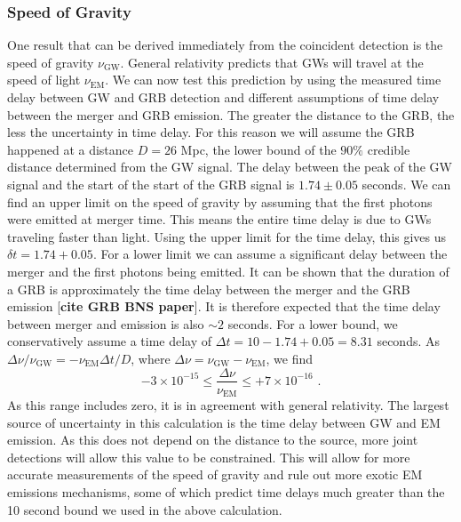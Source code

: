 \documentclass[11pt]{cuthesis}
\newcommand{\fs}{\text{ .}}
\begin{document}
\subsubsection{Speed of Gravity}
One result that can be derived immediately from the coincident detection is the speed of gravity $\nu_\text{GW}$. General relativity predicts that GWs will travel at the speed of light $\nu_\text{EM}$. We can now test this prediction by using the measured time delay between GW and GRB detection and different assumptions of time delay between the merger and GRB emission. The greater the distance to the GRB, the less the uncertainty in time delay. For this reason we will assume the GRB happened at a distance $D = 26$ Mpc, the lower bound of the $90\%$ credible distance determined from the GW signal.  The delay between the peak of the GW signal and the start of the start of the GRB signal is $1.74 \pm 0.05$ seconds. We can find an upper limit on the speed of gravity by assuming that the first photons were emitted at merger time. This means the entire time delay is due to GWs traveling faster than light. Using the upper limit for the time delay, this gives us $\delta t = 1.74 + 0.05$. For a lower limit we can assume a significant delay between the merger and the first photons being emitted. It can be shown that the duration of a GRB is approximately the time delay between the merger and the GRB emission [\textbf{cite GRB BNS paper}]. It is therefore expected that the time delay between merger and emission is also $\sim2$ seconds. For a lower bound, we conservatively assume a time delay of $\Delta t = 10 - 1.74 + 0.05= 8.31$ seconds. As $\Delta \nu /\nu_\text{GW} = -\nu_\text{EM}\Delta t/D$, where $\Delta \nu = \nu_\text{GW} - \nu_\text{EM}$, we find
\begin{equation}
-3 \times 10^{-15} \leq \frac{\Delta \nu}{\nu_\text{EM}} \leq +7\times 10^{-16} \fs
\end{equation}
As this range includes zero, it is in agreement with general relativity. The largest source of uncertainty in this calculation is the time delay between GW and EM emission. As this does not depend on the distance to the source, more joint detections will allow this value to be constrained. This will allow for more accurate measurements of the speed of gravity and rule out more exotic EM emissions mechanisms, some of which predict time delays much greater than the 10 second bound we used in the above calculation.
\end{document}
